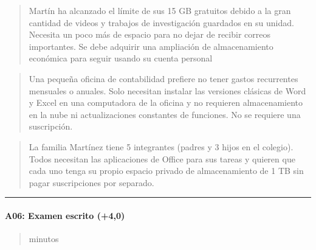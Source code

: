 \documentclass[letterpaper,10pt,spanish]{sphinxmanual}
\begin{document}
\begin{enumerate}
\begin{quote}
\sphinxAtStartPar
{} Martín ha alcanzado el límite de sus 15 GB gratuitos debido a la gran cantidad de videos y trabajos de investigación guardados en su unidad. Necesita un poco más de espacio para no dejar de recibir correos importantes. Se debe adquirir una ampliación de almacenamiento económica para seguir usando su cuenta personal
\end{quote}
\begin{quote}

\sphinxAtStartPar
{} Una pequeña oficina de contabilidad prefiere no tener gastos recurrentes mensuales o anuales. Solo necesitan instalar las versiones clásicas de Word y Excel en una computadora de la oficina y no requieren almacenamiento en la nube ni actualizaciones constantes de funciones. No se requiere una suscripción.
\end{quote}
\begin{quote}

\sphinxAtStartPar
{} La familia Martínez tiene 5 integrantes (padres y 3 hijos en el colegio). Todos necesitan las aplicaciones de Office para sus tareas y quieren que cada uno tenga su propio espacio privado de almacenamiento de 1 TB sin pagar suscripciones por separado.
\end{quote}

\end{enumerate}


\bigskip\hrule\bigskip



\paragraph{A06: Examen escrito (+4,0)}
\label{\detokenize{cursos/ofimatica10/periodo01/G01:a06-examen-escrito-4-0}}
\sphinxAtStartPar
{}
\begin{quote}\begin{description}
 minutos


\end{description}\end{quote}
\end{document}

